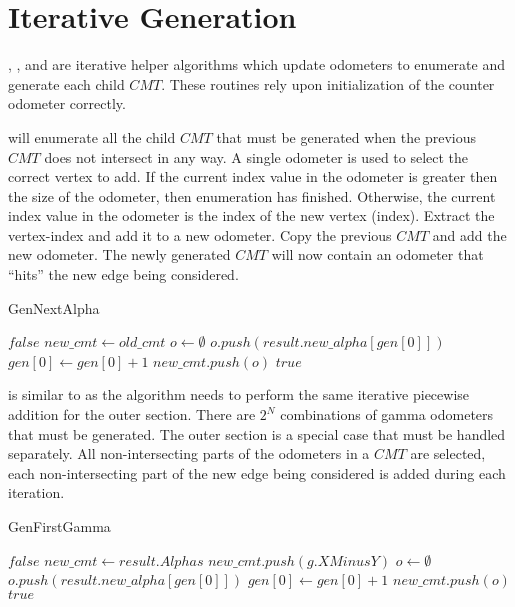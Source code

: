 \newpage
\section{Iterative Generation}
, , and  are iterative helper algorithms which update odometers to enumerate and generate each child $CMT$. These routines rely upon initialization of the counter odometer correctly.

 will enumerate all the child $CMT$ that must be generated when the previous $CMT$ does not intersect in any way. A single odometer is used to select the correct vertex to add.  If the current index value in the odometer is greater then the size of the odometer, then enumeration has finished. Otherwise, the current index value in the odometer is the index of the new vertex (index). Extract the vertex-index and add it to a new odometer. Copy the previous $CMT$ and add the new odometer. The newly generated $CMT$ will now contain an odometer that ``hits'' the new edge being considered.

\begin{algorithm}[H]
    \centering
	\caption{GenNextAlpha}\label{GenNextAlpha}
	\begin{algorithmic}[1]
		
		\State \Return $false$
		\EndIf
		\State $new\_cmt \gets old\_cmt$
		\State $o \gets \emptyset$
		\State $o.push(result.new\_alpha[gen[0]])$
		\State $gen[0] \gets gen[0] +1$
		\State $new\_cmt.push(o)$
		\State \Return $true$ 
		\EndFunction
	\end{algorithmic}
\end{algorithm}

 is similar to  as the algorithm needs to perform the same iterative piecewise addition for the outer section. There are $2^N$ combinations of gamma odometers that must be generated. The outer section is a special case that must be handled separately. All non-intersecting parts of the odometers in a $CMT$ are selected, each non-intersecting part of the new edge being considered is added during each iteration.

\begin{algorithm}[H]
    \centering
	\caption{GenFirstGamma}\label{GenFirstGamma}
	\begin{algorithmic}[1]
		
		\State \Return $false$
		\EndIf
		\State $new\_cmt \gets result.Alphas$
		\State $new\_cmt.push(g.XMinusY)$
		\EndFor
		\State $o \gets \emptyset$
		\State $o.push(result.new\_alpha[gen[0]])$
		\State $gen[0] \gets gen[0] +1$
		\State $new\_cmt.push(o)$
		\State \Return $true$ 
		\EndFunction
	\end{algorithmic}
\end{algorithm}


